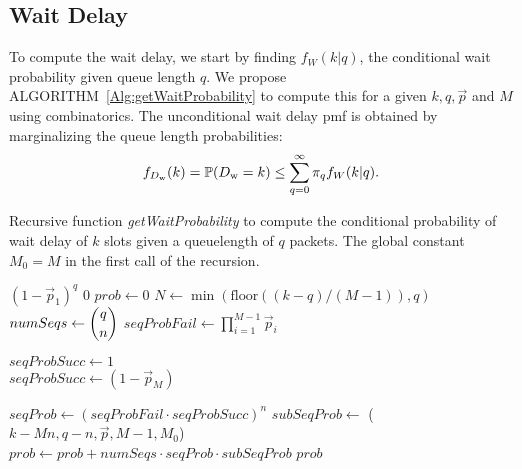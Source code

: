 \subsection{Wait Delay}
To compute the wait delay, we start by finding $f_W(k|q)$, the conditional wait probability given queue length $q$. We propose ALGORITHM~\ref{Alg:getWaitProbability} to compute this for a given $k,q,\Vec{p}$ and $M$ using combinatorics.
The unconditional wait delay pmf is obtained by marginalizing the queue length probabilities:
\begin{equation}
    f_{D_{\mathrm{w}}}(k)=\mathbb{P}(D_{\mathrm{w}}=k) \leq \sum_{q=0}^{\infty}\pi_qf_W(k|q).\label{eq:secIR_waitDelay}
\end{equation}
\begin{algorithm}[t]
\caption{Recursive function \textit{getWaitProbability} to compute the conditional probability of wait delay of $k$ slots given a queuelength of $q$ packets. The global constant $M_0 = M$ in the first call of the recursion.}
\begin{algorithmic}[th]
        \State\Return $(1 - \Vec{p}_1)^q$
        \State\Return $0$
    \EndIf
    \State $prob \gets 0$
    \State $N \gets \min(\text{floor}((k - q) / (M - 1)), q)$\
        \\
        \State $numSeqs \gets \dbinom{q}{n}$
        \State $seqProbFail \gets \prod_{i=1}^{M-1}\Vec{p}_{i}$
        
            \State $seqProbSucc \gets 1$
            \\
        \Else
             \State $seqProbSucc \gets (1 - \Vec{p}_M)$
        \EndIf
        
        \State $seqProb\gets(seqProbFail \cdot seqProbSucc)^n$
        \State $subSeqProb \gets$ 
        \State \qquad\qquad\qquad\qquad($k-Mn, q - n, \Vec{p}, M - 1, M_0$)
        \\\Comment{Recursion.}
        \State $prob \gets prob + numSeqs\!\cdot\!seqProb\!\cdot\!subSeqProb$
    \EndFor
    \State \Return $prob$
\EndFunction
\end{algorithmic}
\label{Alg:getWaitProbability}
\end{algorithm}






